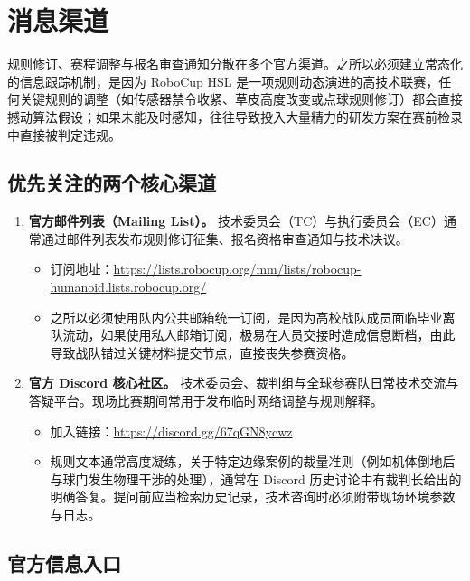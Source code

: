 \section{消息渠道}

规则修订、赛程调整与报名审查通知分散在多个官方渠道。之所以必须建立常态化的信息跟踪机制，是因为 RoboCup HSL 是一项规则动态演进的高技术联赛，任何关键规则的调整（如传感器禁令收紧、草皮高度改变或点球规则修订）都会直接撼动算法假设；如果未能及时感知，往往导致投入大量精力的研发方案在赛前检录中直接被判定违规。\official

\subsection{优先关注的两个核心渠道}

\begin{enumerate}[leftmargin=*]
    \item \textbf{官方邮件列表（Mailing List）。} 技术委员会（TC）与执行委员会（EC）通常通过邮件列表发布规则修订征集、报名资格审查通知与技术决议。\official
    \begin{itemize}
        \item 订阅地址：\url{https://lists.robocup.org/mm/lists/robocup-humanoid.lists.robocup.org/}
        \item 之所以必须使用队内公共邮箱统一订阅，是因为高校战队成员面临毕业离队流动，如果使用私人邮箱订阅，极易在人员交接时造成信息断档，由此导致战队错过关键材料提交节点，直接丧失参赛资格。
    \end{itemize}
    \item \textbf{官方 Discord 核心社区。} 技术委员会、裁判组与全球参赛队日常技术交流与答疑平台。现场比赛期间常用于发布临时网络调整与规则解释。\official
    \begin{itemize}
        \item 加入链接：\url{https://discord.gg/67qGN8ycwz}
        \item 规则文本通常高度凝练，关于特定边缘案例的裁量准则（例如机体倒地后与球门发生物理干涉的处理），通常在 Discord 历史讨论中有裁判长给出的明确答复。提问前应当检索历史记录，技术咨询时必须附带现场环境参数与日志。
    \end{itemize}
\end{enumerate}

\subsection{官方信息入口}

